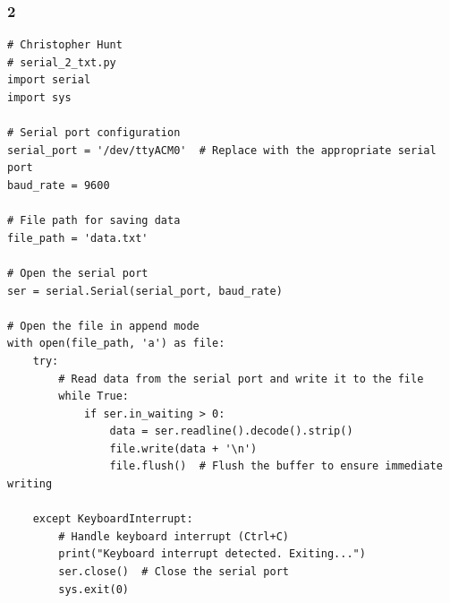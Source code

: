 \documentclass{article}
\begin{document}
\newpage\subsubsection*{2}
\begin{lstlisting}
# Christopher Hunt
# serial_2_txt.py
import serial
import sys

# Serial port configuration
serial_port = '/dev/ttyACM0'  # Replace with the appropriate serial port
baud_rate = 9600

# File path for saving data
file_path = 'data.txt'

# Open the serial port
ser = serial.Serial(serial_port, baud_rate)

# Open the file in append mode
with open(file_path, 'a') as file:
    try:
        # Read data from the serial port and write it to the file
        while True:
            if ser.in_waiting > 0:
                data = ser.readline().decode().strip()
                file.write(data + '\n')
                file.flush()  # Flush the buffer to ensure immediate writing

    except KeyboardInterrupt:
        # Handle keyboard interrupt (Ctrl+C)
        print("Keyboard interrupt detected. Exiting...")
        ser.close()  # Close the serial port
        sys.exit(0)

\end{lstlisting}

\newpage
\end{document}

